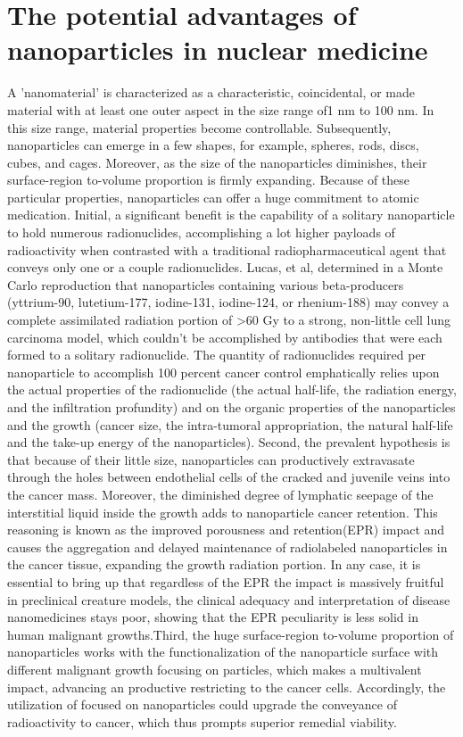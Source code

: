 \documentclass{article}
\begin{document}
\section*{The potential advantages of nanoparticles in nuclear medicine}
A 'nanomaterial' is characterized as a characteristic, coincidental, or made material with at least one outer aspect in the size range of1 nm to 100 nm. In this size range, material properties become controllable. Subsequently, nanoparticles can emerge in a few shapes, for example, spheres, rods, discs, cubes, and cages. Moreover, as the size of the nanoparticles diminishes, their surface-region to-volume proportion is firmly expanding. Because of these particular properties, nanoparticles can offer a huge commitment to atomic medication. Initial, a significant benefit is the capability of a solitary nanoparticle to hold numerous radionuclides, accomplishing a lot higher payloads of radioactivity when contrasted with a traditional radiopharmaceutical agent that conveys only one or a couple radionuclides. Lucas, et al,  determined in a Monte Carlo reproduction that nanoparticles containing various beta-producers (yttrium-90, lutetium-177, iodine-131, iodine-124, or rhenium-188) may convey a complete assimilated radiation portion of >60 Gy to a strong, non-little cell lung carcinoma model, which couldn't be accomplished by antibodies that were each formed to a solitary radionuclide. The quantity of radionuclides required per nanoparticle to accomplish 100 percent cancer control emphatically relies upon the actual properties of the radionuclide (the actual half-life, the radiation energy, and the infiltration profundity) and on the organic properties of the nanoparticles and the growth (cancer size, the intra-tumoral appropriation, the natural half-life and the take-up energy of the nanoparticles). Second, the prevalent hypothesis is that because of their little size, nanoparticles can productively extravasate through the holes between endothelial cells of the cracked and juvenile veins into the cancer mass. Moreover, the diminished degree of lymphatic seepage of the interstitial liquid inside the growth adds to nanoparticle cancer retention. This reasoning is known as the improved porousness and retention(EPR) impact and causes the aggregation and delayed maintenance of radiolabeled nanoparticles in the cancer tissue, expanding the growth radiation portion. In any case, it is essential to bring up that regardless of the EPR the impact is massively fruitful in preclinical creature models, the clinical adequacy and interpretation of disease nanomedicines stays poor, showing that the EPR peculiarity is less solid in human malignant growths.Third, the huge surface-region to-volume proportion of nanoparticles works with the functionalization of the nanoparticle surface with different malignant growth focusing on particles, which makes a multivalent impact, advancing an productive restricting to the cancer cells. Accordingly, the utilization of focused on nanoparticles could upgrade the conveyance of radioactivity to cancer, which thus prompts superior remedial viability.
\end{document}
